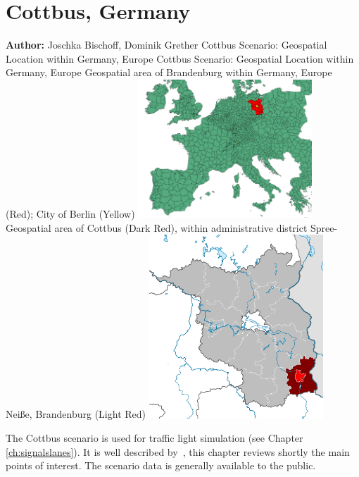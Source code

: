 \section{Cottbus, Germany}
\label{ch:scenarios:cottbus}
\hfill \textbf{Author:} Joschka Bischoff, Dominik Grether
\createfigure%
{Cottbus Scenario: Geospatial Location within Germany, Europe}%
{Cottbus Scenario: Geospatial Location within Germany, Europe}%
{\label{fig:scenarios:cottbus_location}}%
{%
  \createsubfigure%
	{Geospatial area of Brandenburg within Germany, Europe (Red); City of Berlin (Yellow)}
	{\includegraphics[width=0.49\textwidth]{./using/figures/brandenburg_europe.png}}
	{\label{fig:scenarios:cottbus_brandenburg_europe}}
  \createsubfigure%
	{Geospatial area of Cottbus (Dark Red), within administrative district Spree-Neiße, Brandenburg (Light Red)}
	{\includegraphics[width=0.49\textwidth]{./using/figures/brandenburg_spree_neise_cottbus.pdf}}
	{\label{fig:scenarios:cottbus_bb}}
}%
{\citet{Grether2014PhD}}

The Cottbus scenario is used for traffic light simulation (see Chapter \ref{ch:signalslanes}). 
It is well described by~\citet[][pp.~87]{Grether_PhDThesis_2014}, this chapter reviews shortly the main points of interest. 
The scenario data is generally available to the public.

